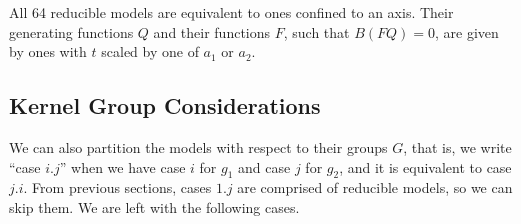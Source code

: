 \begin{prop} All 64 reducible models are equivalent to ones confined to an axis. Their generating functions $Q$ and their functions $F$, such that $B(FQ) =0$, are given by \oneD ones with $t$ scaled by one of $a_1$ or $a_2$.
\end{prop}

\subsection{Kernel Group Considerations}
We can also partition the models with respect to their groups $G$, that is, we write ``case $i.j$'' when we have case $i$ for $g_1$ and case $j$ for $g_2$, and it is equivalent to case $j.i$. From previous sections, cases $1.j$ are comprised of reducible models, so we can skip them. We are left with the following cases.

